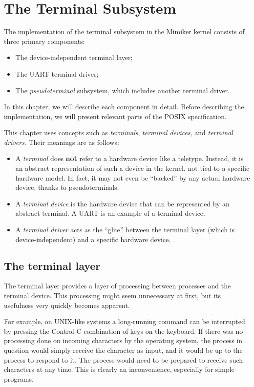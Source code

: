 \documentclass[shortabstract, manyadvisors, english, mgr]{iithesis}
\begin{document}
\chapter{The Terminal Subsystem}

The implementation of the terminal subsystem in the Mimiker kernel consists of
three primary components:
\begin{itemize}
\item The device-independent terminal layer;
\item The UART terminal driver;
\item The \textit{pseudoterminal} subsystem, which includes another terminal
  driver.
\end{itemize}

In this chapter, we will describe each component in detail. Before describing
the implementation, we will present relevant parts of the POSIX specification.

This chapter uses concepts such as \textit{terminals}, \textit{terminal
  devices}, and \textit{terminal drivers}. Their meanings are as follows:
\begin{itemize}
\item A \textit{terminal} does \textbf{not} refer to a hardware device like a
  teletype. Instead, it is an abstract representation of such a device in the
  kernel, not tied to a specific hardware model. In fact, it may not even be
  ``backed'' by any actual hardware device, thanks to pseudoterminals.
\item A \textit{terminal device} is the hardware device that can be represented
  by an abstract terminal. A UART is an example of a terminal device.
\item A \textit{terminal driver} acts as the ``glue'' between the terminal layer
  (which is device-independent) and a specific hardware device.
\end{itemize}

\section{The terminal layer}

The terminal layer provides a layer of processing between processes and the
terminal device. This processing might seem unnecessary at first, but its
usefulness very quickly becomes apparent.

For example, on UNIX-like systems a long-running command can be interrupted by
pressing the Control-C combination of keys on the keyboard. If there was no
processing done on incoming characters by the operating system, the process in
question would simply receive the character as input, and it would be up to the
process to respond to it. The process would need to be prepared to receive such
characters at any time. This is clearly an inconvenience, especially for simple
programs.
\end{document}
